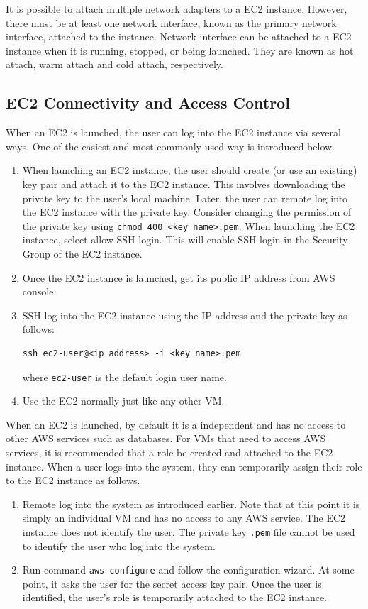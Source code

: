 It is possible to attach multiple network adapters to a EC2 instance. However, there must be at least one network interface, known as the primary network interface, attached to the instance. Network interface can be attached to a EC2 instance when it is running, stopped, or being launched. They are known as hot attach, warm attach and cold attach, respectively.

\subsection{EC2 Connectivity and Access Control}

When an EC2 is launched, the user can log into the EC2 instance via several ways. One of the easiest and most commonly used way is introduced below.
\begin{enumerate}
  \item When launching an EC2 instance, the user should create (or use an existing) key pair and attach it to the EC2 instance. This involves downloading the private key to the user's local machine. Later, the user can remote log into the EC2 instance with the private key. Consider changing the permission of the private key using \texttt{chmod 400 <key name>.pem}.  When launching the EC2 instance, select allow SSH login. This will enable SSH login in the Security Group of the EC2 instance.
  \item Once the EC2 instance is launched, get its public IP address from AWS console.
  \item SSH log into the EC2 instance using the IP address and the private key as follows:
  \begin{lstlisting}
ssh ec2-user@<ip address> -i <key name>.pem
  \end{lstlisting}
  where \verb|ec2-user| is the default login user name.
  \item Use the EC2 normally just like any other VM.
\end{enumerate}

When an EC2 is launched, by default it is a independent  and has no access to other AWS services such as databases. For VMs that need to access AWS services, it is recommended that a role be created and attached to the EC2 instance. When a user logs into the system, they can temporarily assign their role to the EC2 instance as follows.

\begin{enumerate}
    \item Remote log into the system as introduced earlier. Note that at this point it is simply an individual VM and has no access to any AWS service. The EC2 instance does not identify the user. The private key \verb|.pem| file cannot be used to identify the user who log into the system.
    \item Run command \verb|aws configure| and follow the configuration wizard. At some point, it asks the user for the secret access key pair. Once the user is identified, the user's role is temporarily attached to the EC2 instance.
\end{enumerate} 



